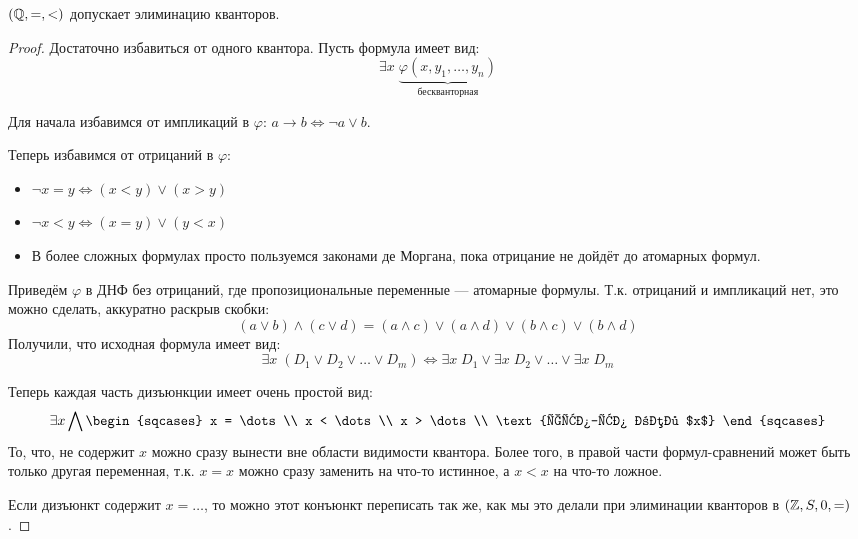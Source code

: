 \begin{theorem}
    $(\mathbb{Q}, =, <)$ допускает элиминацию кванторов.
\end{theorem}
\begin{proof} 
    Достаточно избавиться от одного квантора. Пусть формула имеет вид: $$\exists x \; \underbrace{\varphi(x, y_1, \dots, y_n)}_{\text{бескванторная}}$$

    Для начала избавимся от импликаций в $\varphi$:
    $a \to b \Leftrightarrow \lnot a \vee b$.

    Теперь избавимся от отрицаний в $\varphi$:
    \begin{itemize}
        \item $\lnot x = y \Leftrightarrow (x < y) \vee (x > y)$
        \item $\lnot x < y \Leftrightarrow (x = y) \vee (y < x)$
        \item В более сложных формулах просто пользуемся законами де Моргана, пока отрицание не дойдёт до атомарных формул.
    \end{itemize}

    Приведём $\varphi$ в ДНФ без отрицаний, где пропозициональные переменные --- атомарные формулы. Т.к. отрицаний и импликаций нет, это можно сделать, аккуратно раскрыв скобки: 
    $$(a \vee b) \wedge (c \vee d) = (a \wedge c) \vee (a \wedge d) \vee (b \wedge c) \vee (b \wedge d) $$
    Получили, что исходная формула имеет вид:
    $$\exists x \; (D_1 \vee D_2 \vee \dots \vee D_m) \Longleftrightarrow \exists x \; D_1 \vee \exists x \; D_2 \vee \dots \vee \exists x \; D_m$$

    Теперь каждая часть дизъюнкции имеет очень простой вид:
    $$ \exists x \bigwedge \begin{sqcases}
        x = \dots \\
        x < \dots \\
        x > \dots \\
        \text{что-то без $x$}
    \end{sqcases}$$
    То, что, не содержит $x$ можно сразу вынести вне области видимости квантора. Более того, в правой части формул-сравнений может быть только другая переменная, т.к. $x = x$ можно сразу заменить на что-то истинное, а $x < x$ на что-то ложное.
    
    Если дизъюнкт содержит $x = \dots$, то можно этот конъюнкт переписать так же, как мы это делали при элиминации кванторов в $(\mathbb{Z}, S, 0, =)$.


\end{proof}
